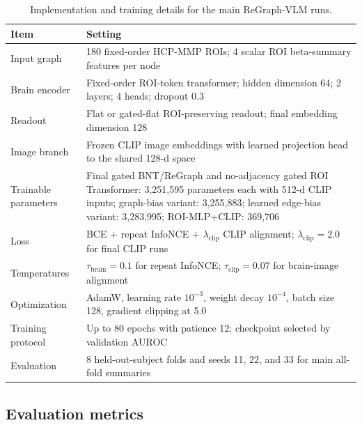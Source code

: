 \documentclass{article}
\begin{document}
\begin{table}[!htbp]
  \centering
  \caption{Implementation and training details for the main ReGraph-VLM runs.}
  \label{tab:implementation_details}
  \scriptsize
  \setlength{\tabcolsep}{5pt}
  \renewcommand{\arraystretch}{1.15}
  \begin{tabularx}{\linewidth}{lX}
    \toprule
    Item & Setting \\
    \midrule
    Input graph & 180 fixed-order HCP-MMP ROIs; 4 scalar ROI beta-summary features per node \\
    Brain encoder & Fixed-order ROI-token transformer; hidden dimension 64; 2 layers; 4 heads; dropout 0.3 \\
    Readout & Flat or gated-flat ROI-preserving readout; final embedding dimension 128 \\
    Image branch & Frozen CLIP image embeddings with learned projection head to the shared 128-d space \\
    Trainable parameters & Final gated BNT/ReGraph and no-adjacency gated ROI Transformer: 3,251,595 parameters each with 512-d CLIP inputs; graph-bias variant: 3,255,883; learned edge-bias variant: 3,283,995; ROI-MLP+CLIP: 369,706 \\
    Loss & BCE + repeat InfoNCE + $\lambda_{\mathrm{clip}}$ CLIP alignment; $\lambda_{\mathrm{clip}}=2.0$ for final CLIP runs \\
    Temperatures & $\tau_{\mathrm{brain}}=0.1$ for repeat InfoNCE; $\tau_{\mathrm{clip}}=0.07$ for brain-image alignment \\
    Optimization & AdamW, learning rate $10^{-3}$, weight decay $10^{-4}$, batch size 128, gradient clipping at 5.0 \\
    Training protocol & Up to 80 epochs with patience 12; checkpoint selected by validation AUROC \\
    Evaluation & 8 held-out-subject folds and seeds 11, 22, and 33 for main all-fold summaries \\
    \bottomrule
  \end{tabularx}
\end{table}

\subsection{Evaluation metrics}
\end{document}

